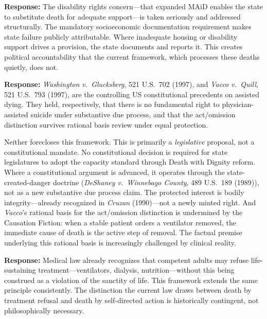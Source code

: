 \documentclass[11pt, letterpaper]{article}
\begin{document}
\medskip

\begin{objectionbox}[title={\sffamily\bfseries\small\color{C@warning}
  Objection 3: ``The disability community opposes this''}]
\textbf{Response:} The disability rights concern---that expanded MAiD enables the state
to substitute death for adequate support---is taken seriously and addressed structurally.
The mandatory socioeconomic documentation requirement makes state failure publicly
attributable. Where inadequate housing or disability support drives a provision, the
state documents and reports it. This creates political accountability that the current
framework, which processes these deaths quietly, does not.
\end{objectionbox}

\medskip

\begin{objectionbox}[title={\sffamily\bfseries\small\color{C@warning}
  Objection 4 (US): ``\textit{Glucksberg} forecloses the constitutional argument''}]
\textbf{Response:} \textit{Washington v.\ Glucksberg}, 521 U.S.\ 702 (1997), and
\textit{Vacco v.\ Quill}, 521 U.S.\ 793 (1997), are the controlling US constitutional
precedents on assisted dying. They held, respectively, that there is no fundamental
right to physician-assisted suicide under substantive due process, and that the
act/omission distinction survives rational basis review under equal protection.

Neither forecloses this framework. This is primarily a \textit{legislative} proposal,
not a constitutional mandate. No constitutional decision is required for state legislatures
to adopt the capacity standard through Death with Dignity reform. Where a constitutional
argument is advanced, it operates through the state-created-danger doctrine
(\textit{DeShaney v.\ Winnebago County}, 489 U.S.\ 189 (1989)), not as a new substantive
due process claim. The protected interest is bodily integrity---already recognized in
\textit{Cruzan} (1990)---not a newly minted right. And \textit{Vacco}'s rational basis
for the act/omission distinction is undermined by the Causation Fiction: when a stable
patient orders a ventilator removed, the immediate cause of death is the active step of
removal. The factual premise underlying this rational basis is increasingly challenged by clinical reality.
\end{objectionbox}

\medskip

\begin{objectionbox}[title={\sffamily\bfseries\small\color{C@warning}
  Objection 5: ``It contradicts the sanctity of life''}]
\textbf{Response:} Medical law already recognizes that competent adults may refuse
life-sustaining treatment---ventilators, dialysis, nutrition---without this being
construed as a violation of the sanctity of life. This framework extends the same
principle consistently. The distinction the current law draws between death by treatment
refusal and death by self-directed action is historically contingent, not philosophically
necessary.
\end{objectionbox}
\end{document}
